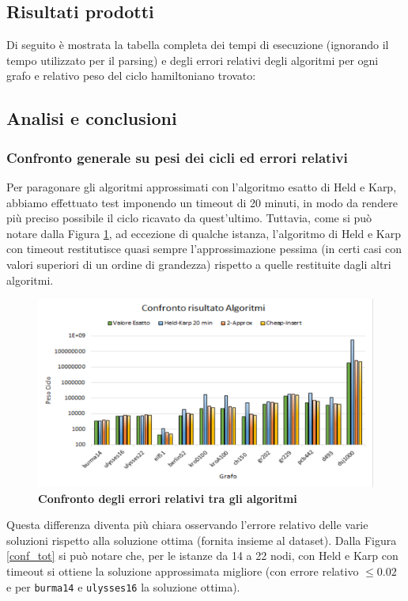 \documentclass[]{article}
\begin{document}
\subsection{Risultati prodotti}
\begin{flushleft}
Di seguito è mostrata la tabella completa dei tempi di esecuzione (ignorando il tempo utilizzato per il parsing) e degli errori relativi degli algoritmi per ogni grafo e relativo peso del ciclo hamiltoniano trovato: 



\subsection{Analisi e conclusioni}
\subsubsection{Confronto generale su pesi dei cicli ed errori relativi}
Per paragonare gli algoritmi approssimati con l'algoritmo esatto di Held e Karp, abbiamo effettuato test imponendo un timeout di 20 minuti, in modo da rendere più preciso possibile il ciclo ricavato da quest'ultimo. Tuttavia, come si può notare dalla Figura \ref{total}, ad eccezione di qualche istanza, l'algoritmo di Held e Karp con timeout restitutisce quasi sempre l'approssimazione pessima (in certi casi con valori superiori di un ordine di grandezza) rispetto a quelle restituite dagli altri algoritmi.
\begin{figure}[H]
	\centering
	\includegraphics[width=\textwidth,height=\textheight,keepaspectratio]{CONFRONTO_RISULTATI.png}
	\caption{\textbf{Confronto degli errori relativi tra gli algoritmi}}
	\label{total}
\end{figure}
Questa differenza diventa più chiara osservando l'errore relativo delle varie soluzioni rispetto alla soluzione ottima (fornita insieme al dataset). Dalla Figura \ref{conf_tot} si può notare che, per le istanze da 14 a 22 nodi, con Held e Karp con timeout si ottiene la soluzione approssimata migliore (con errore relativo $\leq 0.02$ e per \verb|burma14| e \verb|ulysses16| la soluzione ottima).\\

\end{flushleft}
\end{document}
